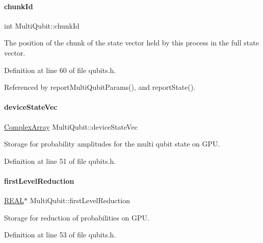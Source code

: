 \paragraph{\texorpdfstring{chunk\+Id}{chunkId}}
{\footnotesize\ttfamily int Multi\+Qubit\+::chunk\+Id}



The position of the chunk of the state vector held by this process in the full state vector. 



Definition at line 60 of file qubits.\+h.



Referenced by report\+Multi\+Qubit\+Params(), and report\+State().

\mbox{\label{structMultiQubit_a59ac613486a41b8c9a4b6e79cc8d2cc3}} 
\paragraph{\texorpdfstring{device\+State\+Vec}{deviceStateVec}}
{\footnotesize\ttfamily \mbox{\hyperlink{structComplexArray}{Complex\+Array}} Multi\+Qubit\+::device\+State\+Vec}



Storage for probability amplitudes for the multi qubit state on G\+PU. 



Definition at line 51 of file qubits.\+h.

\mbox{\label{structMultiQubit_a4e0088b41adab0a40b7a31e528ed42b5}} 
\paragraph{\texorpdfstring{first\+Level\+Reduction}{firstLevelReduction}}
{\footnotesize\ttfamily \mbox{\hyperlink{precision_8h_a4b654506f18b8bfd61ad2a29a7e38c25}{R\+E\+AL}}$\ast$ Multi\+Qubit\+::first\+Level\+Reduction}



Storage for reduction of probabilities on G\+PU. 



Definition at line 53 of file qubits.\+h.

